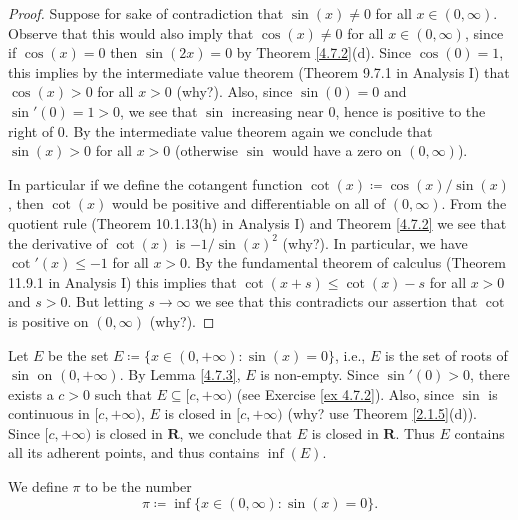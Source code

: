 \begin{proof}
    Suppose for sake of contradiction that \(\sin(x) \neq 0\) for all \(x \in (0, \infty)\).
    Observe that this would also imply that \(\cos(x) \neq 0\) for all \(x \in (0, \infty)\), since if \(\cos(x) = 0\) then \(\sin(2x) = 0\) by Theorem \ref{4.7.2}(d).
    Since \(\cos(0) = 1\), this implies by the intermediate value theorem (Theorem 9.7.1 in Analysis I) that \(\cos(x) > 0\) for all \(x > 0\) (why?).
    Also, since \(\sin(0) = 0\) and \(\sin'(0) = 1 > 0\), we see that \(\sin\) increasing near \(0\), hence is positive to the right of \(0\).
    By the intermediate value theorem again we conclude that \(\sin(x) > 0\) for all \(x > 0\)
    (otherwise \(\sin\) would have a zero on \((0, \infty)\)).

    In particular if we define the cotangent function \(\cot(x) \coloneqq \cos(x) / \sin(x)\), then \(\cot(x)\) would be positive and differentiable on all of \((0, \infty)\).
    From the quotient rule (Theorem 10.1.13(h) in Analysis I) and Theorem \ref{4.7.2} we see that the derivative of \(\cot(x)\) is \(-1 / \sin(x)^2\) (why?).
    In particular, we have \(\cot'(x) \leq -1\) for all \(x > 0\).
    By the fundamental theorem of calculus (Theorem 11.9.1 in Analysis I) this implies that \(\cot(x + s) \leq \cot(x) - s\) for all \(x > 0\) and \(s > 0\).
    But letting \(s \to \infty\) we see that this contradicts our assertion that \(\cot\) is positive on \((0, \infty)\) (why?).
\end{proof}

\begin{note}
    Let \(E\) be the set \(E \coloneqq \{x \in (0, +\infty) : \sin(x) = 0\}\), i.e., \(E\) is the set of roots of \(\sin\) on \((0, +\infty)\).
    By Lemma \ref{4.7.3}, \(E\) is non-empty.
    Since \(\sin'(0) > 0\), there exists a \(c > 0\) such that \(E \subseteq [c, +\infty)\) (see Exercise \ref{ex 4.7.2}).
    Also, since \(\sin\) is continuous in \([c, +\infty)\), \(E\) is closed in \([c, +\infty)\) (why? use Theorem \ref{2.1.5}(d)).
    Since \([c, +\infty)\) is closed in \(\mathbf{R}\), we conclude that \(E\) is closed in \(\mathbf{R}\).
    Thus \(E\) contains all its adherent points, and thus contains \(\inf(E)\).
\end{note}

\begin{definition}\label{4.7.4}
    We define \(\pi\) to be the number
    \[
        \pi \coloneqq \inf\{x \in (0, \infty) : \sin(x) = 0\}.
    \]
\end{definition}

